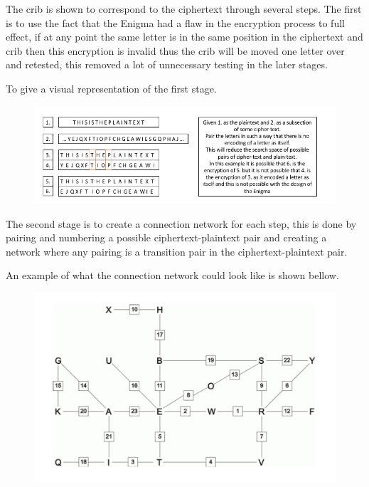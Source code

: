\documentclass[12pt,a4paper]{article}
\begin{document}
The crib is shown to correspond to the ciphertext through several steps. The first is to use the fact that the Enigma had a flaw in the encryption process to full effect, if at any point the same letter is in the same position in the ciphertext and crib then this encryption is invalid thus the crib will be moved one letter over and retested, this removed a lot of unnecessary testing in the later stages. 

To give a visual representation of the first stage.

\begin{figure}[h]
\centering
\includegraphics[width=\textwidth]{StageOneBOMBE.png}
\end{figure}

The second stage is to create a connection network for each step, this is done by pairing and numbering a possible ciphertext-plaintext pair and creating a network where any pairing is a transition pair in the ciphertext-plaintext pair.

An example of what the connection network could look like is shown bellow.

\begin{figure}[h]
\centering
\includegraphics[width=\textwidth]{StageTwoBOMBE.png}
\end{figure}
\end{document}
